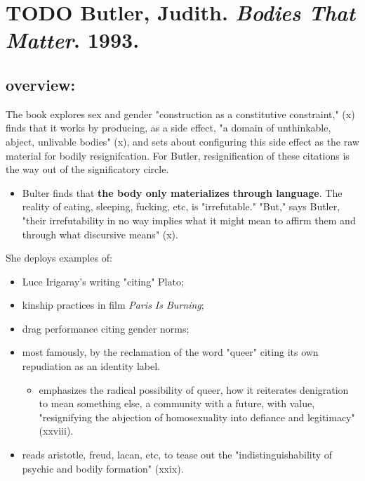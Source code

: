 \documentclass[11pt]{article}
\author{fcalado}
\date{\today}
\title{}
\begin{document}
\tableofcontents

\section{{\bfseries\sffamily TODO} Butler, Judith. \emph{Bodies That Matter}. 1993.}
\label{sec:org59e4da4}
\subsection{overview:}
\label{sec:org42119b9}
The book explores sex and gender "construction as a constitutive
constraint," (x) finds that it works by producing, as a side effect,
"a domain of unthinkable, abject, unlivable bodies" (x), and sets
about configuring this side effect as the raw material for bodily
resignifcation. For Butler, resignification of these citations is the
way out of the significatory circle.
\begin{itemize}
\item Bulter finds that \textbf{the body only materializes through language}. The
reality of eating, sleeping, fucking, etc, is "irrefutable." "But,"
says Butler, "their irrefutability in no way implies what it might
mean to affirm them and through what discursive means" (x).
\end{itemize}

She deploys examples of:
\begin{itemize}
\item Luce Irigaray's writing "citing" Plato;
\item kinship practices in film \emph{Paris Is Burning};
\item drag performance citing gender norms;
\item most famously, by the reclamation of the word "queer" citing its own
repudiation as an identity label.
\begin{itemize}
\item emphasizes the radical possibility of queer, how it reiterates
denigration to mean something else, a community with a future,
with value, "resignifying the abjection of homosexuality into
defiance and legitimacy" (xxviii).
\end{itemize}
\item reads aristotle, freud, lacan, etc, to tease out the
"indistinguishability of psychic and bodily formation" (xxix).
\end{itemize}
\end{document}
